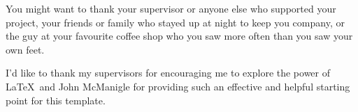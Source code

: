 You might want to thank your supervisor or anyone else who supported your project, your friends or
family who stayed up at night to keep you company, or the guy at your favourite coffee shop who
you saw more often than you saw your own feet.

I'd like to thank my supervisors for encouraging me to explore the power of \LaTeX\ and John
McManigle for providing such an effective and helpful starting point for this template.
